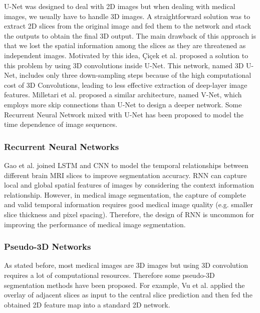 U-Net was designed to deal with 2D images but when dealing with medical images,
we usually have to handle 3D images. A straightforward solution was to extract 2D
slices from the original image and fed them to the network and stack the outputs to
obtain the final 3D output.
The main drawback of this approach is that we lost the spatial information among
the slices as they are threatened as independent images. Motivated by this idea,
Çiçek et al. proposed a solution to this problem by using 3D convolutions inside
U-Net. This network, named 3D U-Net, includes only three down-sampling steps
because of the high computational cost of 3D Convolutions, leading to less
effective extraction of deep-layer image features.
Milletari et al. proposed a similar architecture, named V-Net, which employs more
skip connections than U-Net to design a deeper network.
Some Recurrent Neural Network mixed with U-Net has been proposed to model the
time dependence of image sequences.

\subsubsection{Recurrent Neural Networks}
Gao et al. joined LSTM and CNN to model the temporal relationships between
different brain MRI slices to improve segmentation accuracy. RNN can
capture local and global spatial features of images by considering the context
information
relationship. However, in medical image segmentation, the capture of complete
and valid temporal information requires good medical image quality (e.g. smaller
slice thickness and pixel spacing). Therefore, the design of RNN is uncommon for
improving the performance of medical image segmentation.

\subsubsection{Pseudo-3D Networks}
As stated before, most medical images are 3D images but using 3D
convolution requires a lot of computational resources. Therefore some pseudo-3D
segmentation methods have been proposed. For example, Vu et al. applied the
overlay of adjacent slices as input to the central slice prediction and then
fed the obtained 2D feature map into a standard 2D network.

